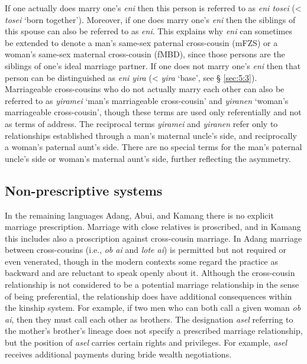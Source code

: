 If one actually does marry one's \textit{eni} then this person is referred to as \textit{eni tosei} ({\textless} \textit{tosei} `born together'). Moreover, if one does marry one's \textit{eni} then the siblings of this spouse can also be referred to as \textit{eni}. This explains why \textit{eni} can sometimes be extended to denote a man's same-sex paternal cross-cousin (mFZS) or a woman's same-sex maternal cross-cousin (fMBD), since those persons are the siblings of one's ideal marriage partner. If one does not marry one's \textit{eni} then that person can be distinguished as \textit{eni yira} ({\textless} \textit{yira} `base', see {\S} \ref{sec:5:3}). Marriageable cross-cousins who do not actually marry each other can also be referred to as \textit{yiramei} `man's marriageable cross-cousin' and \textit{yiranen} `woman's marriageable cross-cousin', though these terms are used only referentially and not as terms of address. The reciprocal terms \textit{yiramei} and \textit{yiranen} refer only to relationships established through a man's maternal uncle's side, and reciprocally a woman's paternal aunt's side. There are no special terms for the man's paternal uncle's side or woman's maternal aunt's side, further reflecting the asymmetry. 

\subsection{Non-prescriptive systems}
In the remaining languages Adang, Abui, and Kamang there is no explicit marriage prescription. Marriage with close relatives is proscribed, and in Kamang this includes also a proscription against cross-cousin marriage. In Adang marriage between cross-cousins (i.e., \textit{ob ai} and \textit{lote ai}) is permitted but not required or even venerated, though in the modern contexts some regard the practice as backward and are reluctant to speak openly about it. Although the cross-cousin relationship is not considered to be a potential marriage relationship in the sense of being preferential, the relationship does have additional consequences within the kinship system. For example, if two men who can both call a given woman \textit{ob ai}, then they must call each other as brothers. The designation \textit{asel} referring to the mother's brother's lineage does not specify a prescribed marriage relationship, but the position of \textit{asel} carries certain rights and privileges. For example, \textit{asel} receives additional payments during bride wealth negotiations. 

